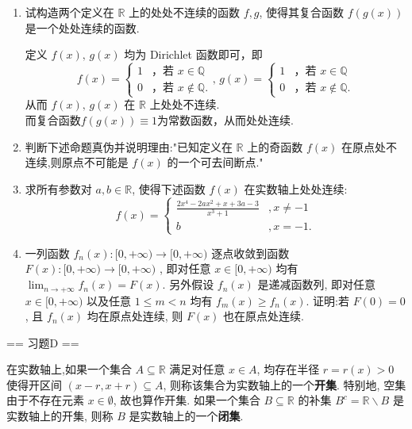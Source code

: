 \begin{enumerate}
    \item[1.]试构造两个定义在 $\mathbb{R}$ 上的处处不连续的函数 $f,g$, 使得其复合函数 $f(g(x))$ 是一个处处连续的函数.
    \begin{solution}
        定义 $f(x),\,g(x)$ 均为 Dirichlet 函数即可，即
        \[
        f(x)=\begin{cases}
            1 & \text{，若 } x\in\mathbb{Q} \\
            0 & \text{，若 } x\notin\mathbb{Q}.
            \end{cases},\,
        g(x)=\begin{cases}
            1 & \text{，若 } x\in\mathbb{Q} \\
            0 & \text{，若 } x\notin\mathbb{Q}.
        \end{cases}
        \]
        从而 $f(x),\,g(x)$ 在 $\mathbb{R}$ 上处处不连续.\\
        而复合函数$f(g(x))\equiv 1$为常数函数，从而处处连续.
    \end{solution}

    \item[2.]判断下述命题真伪并说明理由:"已知定义在 $\mathbb{R}$ 上的奇函数 $f(x)$ 在原点处不连续,则原点不可能是 $f(x)$ 的一个可去间断点."

    \item[3.]求所有参数对 $a,b\in \mathbb{R}$, 使得下述函数 $f(x)$ 在实数轴上处处连续:
    \[
        f(x)=
        \begin{cases}
            \displaystyle\frac{2x^4-2ax^2+x+3a-3}{x^3+1}&, x\neq -1\\
            b                              &, x=-1.
        \end{cases}
    \]

    \item[4.]一列函数 $f_{n}(x):[0, + \infty)\to [0, + \infty)$ 逐点收敛到函数 $F(x):[0, + \infty)\to [0, + \infty)$ ,
    即对任意 $x\in [0, + \infty)$ 均有 $\displaystyle\lim_{n\to +\infty}f_{n}(x) = F(x)$. 另外假设 $f_{n}(x)$ 是递减函数列,
    即对任意 $x\in [0, + \infty)$ 以及任意 $1\leq m< n$ 均有 $f_{m}(x)\geq f_{n}(x)$.
    证明:若 $F(0) = 0$, 且 $f_{n}(x)$ 均在原点处连续, 则 $F(x)$ 也在原点处连续.
\end{enumerate}

== 习题D ==

在实数轴上,如果一个集合 $A\subseteq \mathbb{R}$ 满足对任意 $x\in A$, 均存在半径 $r = r(x) > 0$ 使得开区间 $(x - r,x + r)\subseteq A$,
则称该集合为实数轴上的一个\textbf{开集}. 特别地, 空集由于不存在元素 $x\in \emptyset$, 故也算作开集.
如果一个集合 $B\subseteq \mathbb{R}$ 的补集 $B^{c} = \mathbb{R}\backslash B$ 是实数轴上的开集, 则称 $B$ 是实数轴上的一个\textbf{闭集}.

